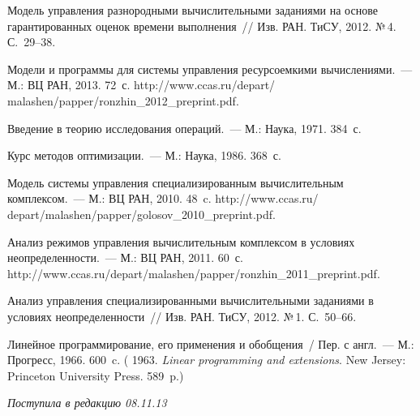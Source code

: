 \begin{multicols}{2}
{{\begin{thebibliography}{9}
Модель управления разнородными вычислительными заданиями на основе гарантированных 
оценок времени выполнения~// Изв. РАН. ТиСУ, 2012. №\,4. С.~29--38.

Модели и программы для сис\-те\-мы управления ресурсоемкими вычислениями.~--- 
М.: ВЦ РАН, 2013.  72~с. {\sf http://www.ccas.ru/depart/ malashen/papper/ronzhin\_2012\_preprint.pdf}.

 Введение в теорию исследования операций.~--- М.: Наука, 1971.
384~с.

Курс методов оптимизации.~--- М.: Наука, 1986. 368~с. 

Модель сис\-те\-мы управ\-ле\-ния специализированным вычислительным комплексом.~--- 
М.: ВЦ РАН, 2010. 48~c. {\sf http://www.ccas.ru/ depart/malashen/papper/golosov\_2010\_preprint.pdf}.

Анализ режимов управ\-ле\-ния вычислительным комплексом в условиях неопределенности.~--- 
М.: ВЦ РАН, 2011. 60~с. 
{\sf http://www.\linebreak ccas.ru/depart/malashen/papper/ronzhin\_2011\_preprint.\linebreak pdf}.

Анализ управления  специализированными вычислительными заданиями в условиях неопределенности~// 
Изв. РАН. ТиСУ, 2012. №\,1. С.~50--66.

 Линейное программирование, его применения и обобщения~/ Пер. с 
англ.~--- М.: Прогресс, 1966. 600~c. 
(  1963. \textit{Linear programming and extensions}. 
New Jersey: Princeton University Press. 589~p.)

\end{thebibliography}
} }

\end{multicols}

\vspace*{-6pt}

\hfill{\small\textit{Поступила в редакцию 08.11.13}}


